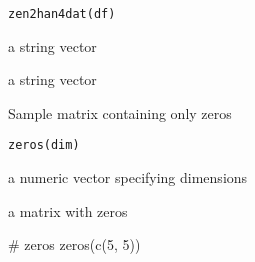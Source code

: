 \documentclass[letterpaper]{book}
\begin{document}
%
\begin{Usage}
\begin{verbatim}
zen2han4dat(df)
\end{verbatim}
\end{Usage}
%
\begin{Arguments}
\begin{ldescription}
\item[\code{df}] a string vector
\end{ldescription}
\end{Arguments}
%
\begin{Value}
a string vector
\end{Value}
%
\begin{Description}
Sample matrix containing only zeros
\end{Description}
%
\begin{Usage}
\begin{verbatim}
zeros(dim)
\end{verbatim}
\end{Usage}
%
\begin{Arguments}
\begin{ldescription}
\item[\code{dim}] a numeric vector specifying dimensions
\end{ldescription}
\end{Arguments}
%
\begin{Value}
a matrix with zeros
\end{Value}
%
\begin{Examples}
\begin{ExampleCode}
# zeros
zeros(c(5, 5))

\end{ExampleCode}
\end{Examples}
\printindex{}
\end{document}
